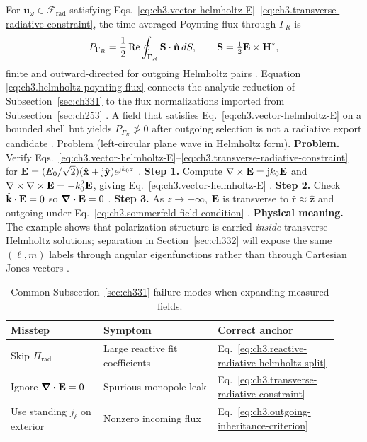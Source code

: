 For \(\mathbf{u}_\omega\in\mathcal{F}_{\mathrm{rad}}\) satisfying Eqs.~\eqref{eq:ch3.vector-helmholtz-E}--\eqref{eq:ch3.transverse-radiative-constraint},
the time-averaged Poynting flux through \(\Gamma_R\) is
\begin{equation}
\label{eq:ch3.helmholtz-poynting-flux}
P_{\Gamma_R}
=
\frac{1}{2}\Re\oint_{\Gamma_R}
\mathbf{S}\cdot\hat{\mathbf{n}}\,dS,
\qquad
\mathbf{S}=\tfrac12\mathbf{E}\times\mathbf{H}^{*},
\end{equation}
finite and outward-directed for outgoing Helmholtz pairs . Equation
\eqref{eq:ch3.helmholtz-poynting-flux} connects the analytic reduction of Subsection~\ref{sec:ch331} to the flux
normalizations imported from Subsection~\ref{sec:ch253} . A
field that satisfies Eq.~\eqref{eq:ch3.vector-helmholtz-E} on a bounded shell but yields
\(P_{\Gamma_R}\not>0\) after outgoing selection is not a radiative export candidate .
Problem (left-circular plane wave in Helmholtz form). \textbf{Problem.} Verify Eqs.~\eqref{eq:ch3.vector-helmholtz-E}--\eqref{eq:ch3.transverse-radiative-constraint} for
\(\mathbf{E}=(E_{0}/\sqrt{2})(\hat{\mathbf{x}}+\mathrm{j}\hat{\mathbf{y}})e^{\mathrm{j} k_{0}z}\) .
\textbf{Step 1.} Compute \(\nabla\times\mathbf{E}=\mathrm{j} k_{0}\mathbf{E}\) and \(\nabla\times\nabla\times\mathbf{E}=-k_{0}^{2}\mathbf{E}\), giving
Eq.~\eqref{eq:ch3.vector-helmholtz-E} .
\textbf{Step 2.} Check \(\hat{\mathbf{k}}\cdot\mathbf{E}=0\) so \(\div\mathbf{E}=0\) .
\textbf{Step 3.} As \(z\to+\infty\), \(\mathbf{E}\) is transverse to \(\hat{\mathbf{r}}\approx\hat{\mathbf{z}}\) and outgoing
under Eq.~\eqref{eq:ch2.sommerfeld-field-condition} .
\textbf{Physical meaning.} The example shows that polarization structure is carried \emph{inside} transverse
Helmholtz solutions; separation in Section~\ref{sec:ch332} will expose the same \((\ell,m)\) labels through angular
eigenfunctions rather than through Cartesian Jones vectors .
\begin{table}[t]
\centering
\caption{Common Subsection~\ref{sec:ch331} failure modes when expanding measured fields.}
\label{tab:ch3.331-failure-modes}
\small
\begin{tabular}{@{}p{0.26\linewidth}p{0.32\linewidth}p{0.34\linewidth}@{}}
\toprule
Misstep & Symptom & Correct anchor \\
\midrule
Skip \(\Pi_{\mathrm{rad}}\) &
Large reactive fit coefficients &
Eq.~\eqref{eq:ch3.reactive-radiative-helmholtz-split} \\
\addlinespace
Ignore \(\div\mathbf{E}=0\) &
Spurious monopole leak &
Eq.~\eqref{eq:ch3.transverse-radiative-constraint} \\
\addlinespace
Use standing \(j_\ell\) on exterior &
Nonzero incoming flux &
Eq.~\eqref{eq:ch3.outgoing-inheritance-criterion} \\
\bottomrule
\end{tabular}
\end{table}
